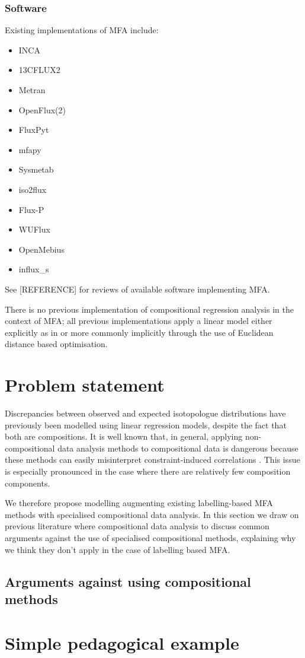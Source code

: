 \documentclass{article}
\def\tightlist{}
\begin{document}
\subsubsection{Software}\label{software}

Existing implementations of MFA include:

\begin{itemize}
\tightlist
\item
  INCA
\item
  13CFLUX2
\item
  Metran
\item
  OpenFlux(2)
\item
  FluxPyt
\item
  mfapy
\item
  Sysmetab
\item
  iso2flux
\item
  Flux-P
\item
  WUFlux
\item
  OpenMebius
\item
  influx\_s
\end{itemize}

See {[}REFERENCE{]} for reviews of available software implementing MFA.

There is no previous implementation of compositional regression analysis
in the context of MFA; all previous implementations apply a linear model
either explicitly as in \citep[Eq. 3]{theorellBeCertainUncertainty2017}
or more commonly implicitly through the use of Euclidean distance based
optimisation.

\section{Problem statement}\label{problem-statement}

Discrepancies between observed and expected isotopologue distributions
have previously been modelled using linear regression models, despite
the fact that both are compositions. It is well known that, in general,
applying non-compositional data analysis methods to compositional data
is dangerous because these methods can easily misinterpret
constraint-induced correlations \citep[Ch.
3]{aitchisonjStatisticalAnalysisCompositional}. This issue is especially
pronounced in the case where there are relatively few composition
components.

We therefore propose modelling augmenting existing labelling-based MFA
methods with specialised compositional data analysis. In this section we
draw on previous literature where compositional data analysis to discuss
common arguments against the use of specialised compositional methods,
explaining why we think they don't apply in the case of labelling based
MFA.

\subsection{Arguments against using compositional
methods}\label{arguments-against-using-compositional-methods}

\section{Simple pedagogical example}\label{simple-pedagogical-example}




\end{document}
